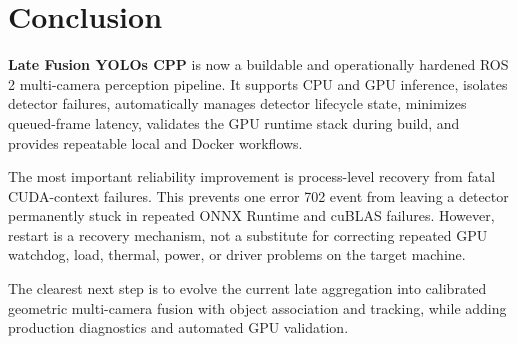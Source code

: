 \documentclass[11pt,a4paper]{article}
\newcommand{\project}{\textbf{Late Fusion YOLOs CPP}}
\begin{document}
\section{Conclusion}

\project{} is now a buildable and operationally hardened ROS 2 multi-camera perception pipeline. It supports CPU and GPU inference, isolates detector failures, automatically manages detector lifecycle state, minimizes queued-frame latency, validates the GPU runtime stack during build, and provides repeatable local and Docker workflows.

The most important reliability improvement is process-level recovery from fatal CUDA-context failures. This prevents one error 702 event from leaving a detector permanently stuck in repeated ONNX Runtime and cuBLAS failures. However, restart is a recovery mechanism, not a substitute for correcting repeated GPU watchdog, load, thermal, power, or driver problems on the target machine.

The clearest next step is to evolve the current late aggregation into calibrated geometric multi-camera fusion with object association and tracking, while adding production diagnostics and automated GPU validation.
\end{document}
